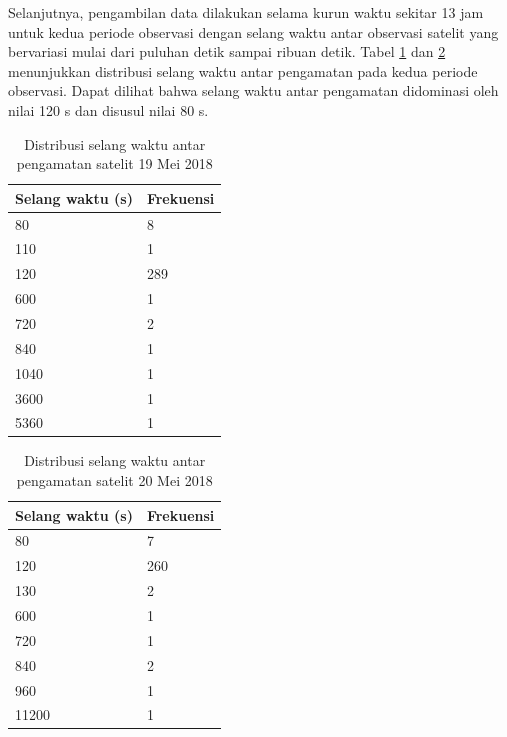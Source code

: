 Selanjutnya, pengambilan data dilakukan selama kurun waktu sekitar 13 jam untuk
kedua periode observasi dengan selang waktu antar observasi satelit yang
bervariasi mulai dari puluhan detik sampai ribuan detik. Tabel
\ref{table:time19} dan \ref{table:time20} menunjukkan distribusi selang waktu
antar pengamatan pada kedua periode observasi. Dapat dilihat bahwa selang waktu
antar pengamatan didominasi oleh nilai 120 s dan disusul nilai 80 s.

\begin{table}[!ht]
\begin{center}
\caption{Distribusi selang waktu antar pengamatan satelit 19 Mei 2018}
\label{table:time19}
\begin{tabular}{|l|l|}
\hline
Selang waktu (s) & Frekuensi \\ \hline
80               & 8         \\ \hline
110              & 1         \\ \hline
120              & 289       \\ \hline
600              & 1         \\ \hline
720              & 2         \\ \hline
840              & 1         \\ \hline
1040             & 1         \\ \hline
3600             & 1         \\ \hline
5360             & 1         \\ \hline
\end{tabular}
\end{center}
\vspace{-5mm}
\end{table}

\begin{table}[!ht]
\begin{center}
\caption{Distribusi selang waktu antar pengamatan satelit 20 Mei 2018}
\label{table:time20}
\begin{tabular}{|l|l|}
\hline
Selang waktu (s) & Frekuensi \\ \hline
80               & 7         \\ \hline
120              & 260       \\ \hline
130              & 2         \\ \hline
600              & 1         \\ \hline
720              & 1         \\ \hline
840              & 2         \\ \hline
960              & 1         \\ \hline
11200            & 1         \\ \hline
\end{tabular}
\end{center}
\vspace{-5mm}
\end{table}

